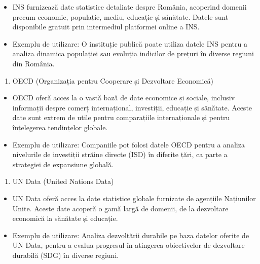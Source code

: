 \documentclass[
  11pt,
  b5paper,
  nottoc]{book}
\providecommand{\tightlist}{%
  \setlength{\itemsep}{0pt}\setlength{\parskip}{0pt}}\usepackage{longtable,booktabs,array}
\begin{document}
\begin{itemize}
\tightlist
\item
  INS furnizează date statistice detaliate despre România, acoperind
  domenii precum economie, populație, mediu, educație și sănătate.
  Datele sunt disponibile gratuit prin intermediul platformei online a
  INS.\\
\item
  Exemplu de utilizare: O instituție publică poate utiliza datele INS
  pentru a analiza dinamica populației sau evoluția indicilor de prețuri
  în diverse regiuni din România.
\end{itemize}

\begin{enumerate}
\def\labelenumi{\arabic{enumi}.}
\setcounter{enumi}{2}
\tightlist
\item
  OECD (Organizația pentru Cooperare și Dezvoltare Economică)\\
\end{enumerate}

\begin{itemize}
\tightlist
\item
  OECD oferă acces la o vastă bază de date economice și sociale,
  inclusiv informații despre comerț internațional, investiții, educație
  și sănătate. Aceste date sunt extrem de utile pentru comparațiile
  internaționale și pentru înțelegerea tendințelor globale.\\
\item
  Exemplu de utilizare: Companiile pot folosi datele OECD pentru a
  analiza nivelurile de investiții străine directe (ISD) în diferite
  țări, ca parte a strategiei de expansiune globală.
\end{itemize}

\begin{enumerate}
\def\labelenumi{\arabic{enumi}.}
\setcounter{enumi}{3}
\tightlist
\item
  UN Data (United Nations Data)\\
\end{enumerate}

\begin{itemize}
\tightlist
\item
  UN Data oferă acces la date statistice globale furnizate de agențiile
  Națiunilor Unite. Aceste date acoperă o gamă largă de domenii, de la
  dezvoltare economică la sănătate și educație.\\
\item
  Exemplu de utilizare: Analiza dezvoltării durabile pe baza datelor
  oferite de UN Data, pentru a evalua progresul în atingerea
  obiectivelor de dezvoltare durabilă (SDG) în diverse regiuni.
\end{itemize}
\end{document}

